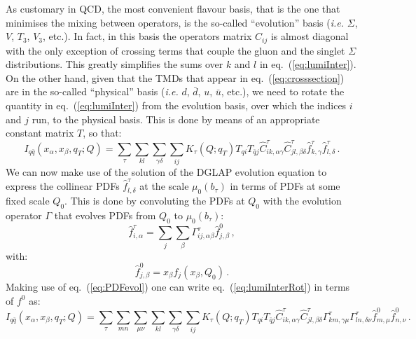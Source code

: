 \documentclass[10pt,a4paper]{article}
\begin{document}
As customary in QCD, the most convenient flavour basis, that is the
one that minimises the mixing between operators, is the so-called
``evolution'' basis (\textit{i.e.} $\Sigma$, $V$, $T_3$, $V_3$,
etc.). In fact, in this basis the operators matrix $C_{ij}$ is almost
diagonal with the only exception of crossing terms that couple the
gluon and the singlet $\Sigma$ distributions. This greatly simplifies
the sums over $k$ and $l$ in eq.~(\ref{eq:lumiInter}). On the other
hand, given that the TMDs that appear in eq.~(\ref{eq:crosssection})
are in the so-called ``physical'' basis (\textit{i.e.} $d$, $\bar{d}$,
$u$, $\bar{u}$, etc.), we need to rotate the quantity in
eq.~(\ref{eq:lumiInter}) from the evolution basis, over which the
indices $i$ and $j$ run, to the physical basis. This is done by means
of an appropriate constant matrix $T$, so that:
\begin{equation}\label{eq:lumiInterRot}
I_{q\bar{q}}(x_\alpha,x_\beta,q_T;Q)= \sum_\tau \sum_{kl} \sum_{\gamma\delta}\sum_{ij}K_\tau(Q;q_T) T_{qi}T_{\bar{q}j}\hat{C}_{ik,\alpha\gamma}^\tau
  \hat{C}_{jl,\beta\delta}^\tau \hat{f}_{k,\gamma}^\tau \hat{f}_{l,\delta}^\tau\,.
\end{equation}
We can now make use of the solution of the DGLAP evolution equation to
express the collinear PDFs $\hat{f}_{l,\delta}^\tau$ at the scale
$\mu_0(b_\tau)$ in terms of PDFs at some fixed scale $Q_0$. This is
done by convoluting the PDFs at $Q_0$ with the evolution operator
$\Gamma$ that evolves PDFs from $Q_0$ to $\mu_0(b_\tau)$:
\begin{equation}\label{eq:PDFevol}
\hat{f}_{i,\alpha}^\tau = \sum_j \sum_\beta
\Gamma_{ij,\alpha\beta}^\tau \hat{f}_{j,\beta}^0\,,
\end{equation}
with:
\begin{equation}
\hat{f}_{j,\beta}^0 = x_\beta f_j(x_\beta,Q_0)\,.
\end{equation}
Making use of eq.~(\ref{eq:PDFevol}) one can write
eq.~(\ref{eq:lumiInterRot}) in terms of $f^0$ as:
\begin{equation}
  I_{q\bar{q}}(x_\alpha,x_\beta,q_T;Q)= \sum_\tau \sum_{mn}\sum_{\mu\nu}\sum_{kl} \sum_{\gamma\delta} \sum_{ij}K_\tau(Q;q_T) T_{qi}T_{\bar{q}j}\hat{C}_{ik,\alpha\gamma}^\tau \hat{C}_{jl,\beta\delta}^\tau\Gamma_{km,\gamma\mu}^\tau\Gamma_{ln,\delta\nu}^\tau\hat{f}_{m,\mu}^0 \hat{f}_{n,\nu}^0\,.
\end{equation}
\end{document}
